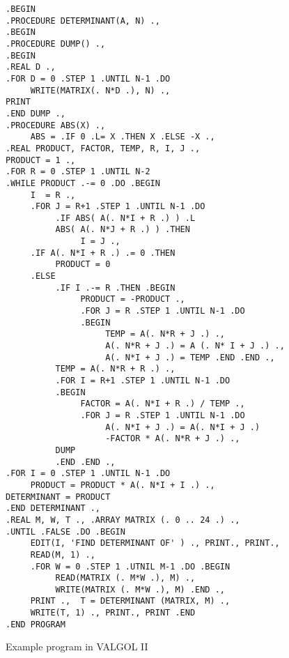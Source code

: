 \documentclass[notitlepage,twocolumn]{report}
\begin{document}
\begin{figure}
\caption{Example program in VALGOL II}
\begin{verbatim}
.BEGIN
.PROCEDURE DETERMINANT(A, N) .,
.BEGIN
.PROCEDURE DUMP() .,
.BEGIN
.REAL D .,
.FOR D = 0 .STEP 1 .UNTIL N-1 .DO
     WRITE(MATRIX(. N*D .), N) .,
PRINT
.END DUMP .,
.PROCEDURE ABS(X) .,
     ABS = .IF 0 .L= X .THEN X .ELSE -X .,
.REAL PRODUCT, FACTOR, TEMP, R, I, J .,
PRODUCT = 1 .,
.FOR R = 0 .STEP 1 .UNTIL N-2
.WHILE PRODUCT .-= 0 .DO .BEGIN
     I  = R .,
     .FOR J = R+1 .STEP 1 .UNTIL N-1 .DO
          .IF ABS( A(. N*I + R .) ) .L
          ABS( A(. N*J + R .) ) .THEN
               I = J .,
     .IF A(. N*I + R .) .= 0 .THEN
          PRODUCT = 0
     .ELSE
          .IF I .-= R .THEN .BEGIN
               PRODUCT = -PRODUCT .,
               .FOR J = R .STEP 1 .UNTIL N-1 .DO
               .BEGIN
                    TEMP = A(. N*R + J .) .,
                    A(. N*R + J .) = A (. N* I + J .) .,
                    A(. N*I + J .) = TEMP .END .END .,
          TEMP = A(. N*R + R .) .,
          .FOR I = R+1 .STEP 1 .UNTIL N-1 .DO
          .BEGIN
               FACTOR = A(. N*I + R .) / TEMP .,
               .FOR J = R .STEP 1 .UNTIL N-1 .DO
                    A(. N*I + J .) = A(. N*I + J .)
                    -FACTOR * A(. N*R + J .) .,
          DUMP
          .END .END .,
.FOR I = 0 .STEP 1 .UNTIL N-1 .DO
     PRODUCT = PRODUCT * A(. N*I + I .) .,
DETERMINANT = PRODUCT
.END DETERMINANT .,
.REAL M, W, T ., .ARRAY MATRIX (. 0 .. 24 .) .,
.UNTIL .FALSE .DO .BEGIN
     EDIT(I, 'FIND DETERMINANT OF' ) ., PRINT., PRINT.,
     READ(M, 1) .,
     .FOR W = 0 .STEP 1 .UTNIL M-1 .DO .BEGIN
          READ(MATRIX (. M*W .), M) .,
          WRITE(MATRIX (. M*W .), M) .END .,
     PRINT .,  T = DETERMINANT (MATRIX, M) .,
     WRITE(T, 1) ., PRINT., PRINT .END
.END PROGRAM
\end{verbatim}
\end{figure}
\end{document}
